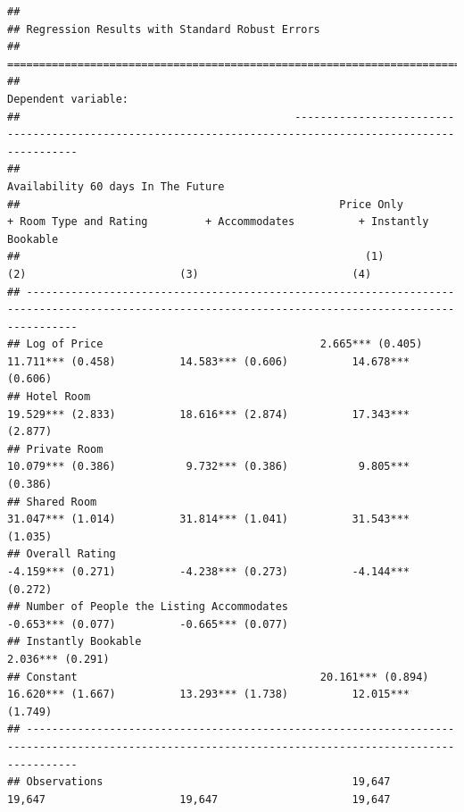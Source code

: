 \documentclass[
]{article}
\begin{document}
\begin{verbatim}
## 
## Regression Results with Standard Robust Errors
## ====================================================================================================================================================
##                                                                                      Dependent variable:                                            
##                                           ----------------------------------------------------------------------------------------------------------
##                                                                               Availability 60 days In The Future                                    
##                                                  Price Only           + Room Type and Rating         + Accommodates          + Instantly Bookable   
##                                                      (1)                       (2)                        (3)                        (4)            
## ----------------------------------------------------------------------------------------------------------------------------------------------------
## Log of Price                                  2.665*** (0.405)          11.711*** (0.458)          14.583*** (0.606)          14.678*** (0.606)     
## Hotel Room                                                              19.529*** (2.833)          18.616*** (2.874)          17.343*** (2.877)     
## Private Room                                                            10.079*** (0.386)           9.732*** (0.386)           9.805*** (0.386)     
## Shared Room                                                             31.047*** (1.014)          31.814*** (1.041)          31.543*** (1.035)     
## Overall Rating                                                          -4.159*** (0.271)          -4.238*** (0.273)          -4.144*** (0.272)     
## Number of People the Listing Accommodates                                                          -0.653*** (0.077)          -0.665*** (0.077)     
## Instantly Bookable                                                                                                             2.036*** (0.291)     
## Constant                                      20.161*** (0.894)         16.620*** (1.667)          13.293*** (1.738)          12.015*** (1.749)     
## ----------------------------------------------------------------------------------------------------------------------------------------------------
## Observations                                       19,647                     19,647                     19,647                     19,647          

\end{verbatim}
\end{document}
